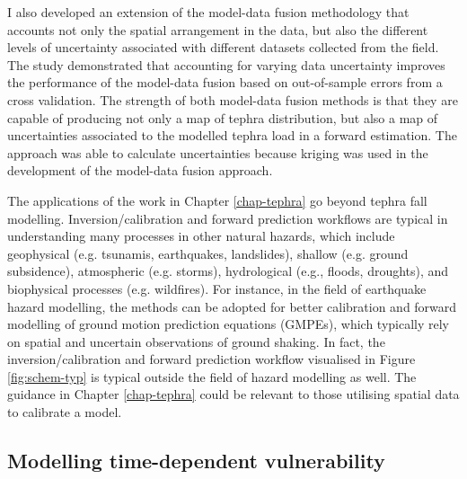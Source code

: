 I also developed an extension of the model-data fusion methodology that accounts not only the spatial arrangement in the data, but also the different levels of uncertainty associated with different datasets collected from the field. The study demonstrated that accounting for varying data uncertainty improves the performance of the model-data fusion based on out-of-sample errors from a cross validation. The strength of both model-data fusion methods is that they are capable of producing not only a map of tephra distribution, but also a map of uncertainties associated to the modelled tephra load in a forward estimation. The approach was able to calculate uncertainties because kriging was used in the development of the model-data fusion approach. 

The applications of the work in Chapter \ref{chap-tephra} go beyond tephra fall modelling. Inversion/calibration and forward prediction workflows are typical in understanding many processes in other natural hazards, which include geophysical (e.g. tsunamis, earthquakes, landslides), shallow (e.g. ground subsidence), atmospheric (e.g. storms), hydrological (e.g., floods, droughts), and biophysical processes (e.g. wildfires). For instance, in the field of earthquake hazard modelling, the methods can be adopted for better calibration and forward modelling of ground motion prediction equations (GMPEs), which typically rely on spatial and uncertain observations of ground shaking. In fact, the inversion/calibration and forward prediction workflow visualised in Figure \ref{fig:schem-typ} is typical outside the field of hazard modelling as well. The guidance in Chapter \ref{chap-tephra} could be relevant to those utilising spatial data to calibrate a model.



\subsection{Modelling time-dependent vulnerability}

